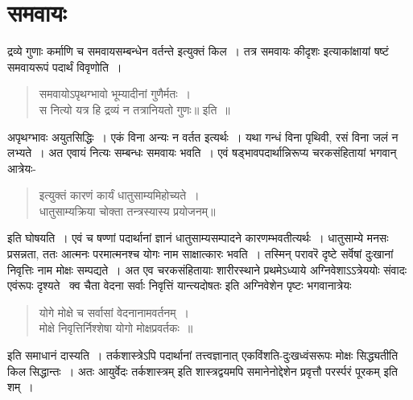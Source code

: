 {\section*{समवायः}
 
द्रव्ये गुणाः कर्माणि च समवायसम्बन्धेन वर्तन्ते इत्युक्तं किल~। तत्र समवायः कीदृशः इत्याकांक्षायां षष्टं समवायरूपं पदार्थं विवृणोति~। 
\begin{verse}
समवायोऽपृथग्भावो भूम्यादीनां गुणैर्मतः~। \\
स नित्यो यत्र हि द्रव्यं न तत्रानियतो गुणः॥ इति~॥
\end{verse}
अपृथग्भावः अयुतसिद्धिः~। एकं विना अन्यः न वर्तत इत्यर्थः~। यथा गन्धं विना पृथिवी, रसं विना जलं न लभ्यते~। अत एवायं नित्यः सम्बन्धः समवायः भवति~। एवं षड्भावपदार्थान्निरूप्य चरकसंहितायां भगवान् आत्रेयः-
\begin{verse}
इत्युक्तं कारणं कार्यं धातुसाम्यमिहोच्यते~। \\
धातुसाम्यक्रिया चोक्ता तन्त्रस्यास्य प्रयोजनम्॥
\end{verse}
इति घोषयति~। एवं च षण्णां पदार्थानां ज्ञानं धातुसाम्यसम्पादने कारणम्भवतीत्यर्थः~। धातुसाम्ये मनसः प्रसन्नता, ततः आत्मनः परमात्मनश्च योगः नाम साक्षात्कारः भवति~। तस्मिन् परावरॆ दृष्टे सर्वॆषां दुःखानां निवृत्तिः नाम मोक्षः सम्पद्यते~। अत एव चरकसंहितायाः शारीरस्थाने प्रथमेऽध्याये अग्निवेशाऽऽत्रेययोः संवादः एवंरूपः दृश्यते \ क्व चैता वेदना सर्वाः निवृत्तिं यान्त्यदोषतः इति अग्निवेशेन पृष्टः भगवानात्रेयः
\begin{verse}
योगे मोक्षे च सर्वासां वेदनानामवर्तनम्~। \\
मोक्षे निवृत्तिर्निश्शेषा योगो मोक्षप्रवर्तकः~॥
\end{verse}
इति समाधानं दास्यति~। तर्कशास्त्रेऽपि पदार्थानां तत्त्वज्ञानात् एकविंशति-दुःखध्वंसरूपः मोक्षः सिद्ध्यतीति किल सिद्धान्तः~। अतः आयुर्वेदः तर्कशास्त्रम् इति शास्त्रद्वयमपि समानेनोद्देशेन प्रवृत्तौ परर्स्परं पूरकम् इति शम्~। 

\articleend
}
